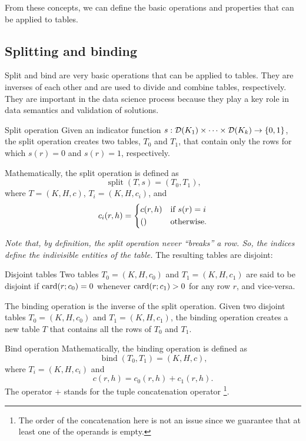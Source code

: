 From these concepts, we can define the basic operations and properties that can be applied
to tables.

\subsection{Splitting and binding}

Split and bind are very basic operations that can be applied to tables.  They are
inverses of each other and are used to divide and combine tables, respectively.
They are important in the data science process because they play a key role in
data semantics and validation of solutions.

\begin{definition}{Split operation}\label{def:split}
Given an indicator function $s : \domainof{K_1} \times \dots \times \domainof{K_k} \to
\left\{0, 1\right\}$, the split operation creates two tables, $T_0$ and $T_1$, that
contain only the rows for which
$s(r) = 0$ and $s(r) = 1$, respectively.

Mathematically, the split operation is defined as \[
  \operatorname{split}(T, s) = \left(T_0, T_1\right)\text{,}
\] where $T = (K, H, c)$, $T_i = (K, H, c_i)$, and \[
  c_i(r, h) = \begin{dcases}
    c(r, h) & \text{if } s(r) = i \\
    () & \text{otherwise.}
  \end{dcases}
\]
\end{definition}

\emph{Note that, by definition, the split operation never ``breaks'' a row.  So, the
indices define the indivisible entities of the table.}  The resulting tables are
disjoint:

\begin{definition}{Disjoint tables}\label{def:disjoint-tables}
  Two tables $T_0 = (K, H, c_0)$ and $T_1 = (K, H, c_1)$ are said to be disjoint if
  $\rowcard[r; c_0] = 0$ whenever $\rowcard[r; c_1] > 0$ for any row $r$, and vice-versa.
\end{definition}

The binding operation is the inverse of the split operation.  Given two disjoint tables
$T_0 = (K, H, c_0)$ and $T_1 = (K, H, c_1)$, the binding operation creates a new table $T$
that contains all the rows of $T_0$ and $T_1$.

\begin{definition}{Bind operation}\label{def:bind}
  Mathematically, the binding operation is defined as \[
    \operatorname{bind}(T_0, T_1) = (K, H, c)\text{,}
  \] where $T_i = (K, H, c_i)$ and \[ c(r, h) = c_0(r, h) + c_1(r, h)\text{.} \]
  The operator $+$ stands for the tuple concatenation operator%
  \footnote{The order of the concatenation here is not an issue since we guarantee
  that at least one of the operands is empty.}.
\end{definition}

